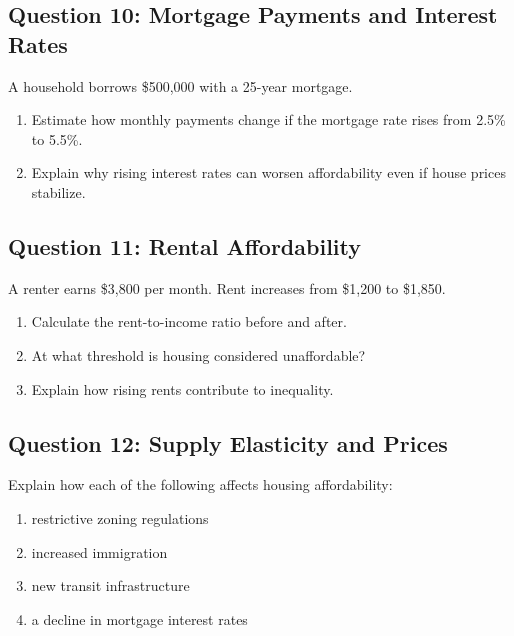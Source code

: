 \documentclass[11pt]{article}
\begin{document}

\subsection*{Question 10: Mortgage Payments and Interest Rates}

A household borrows \$500,000 with a 25-year mortgage.

\begin{enumerate}
\item Estimate how monthly payments change if the mortgage rate rises from 2.5\% to 5.5\%.
\item Explain why rising interest rates can worsen affordability even if house prices stabilize.
\end{enumerate}


\subsection*{Question 11: Rental Affordability}

A renter earns \$3,800 per month. Rent increases from \$1,200 to \$1,850.

\begin{enumerate}
\item Calculate the rent-to-income ratio before and after.
\item At what threshold is housing considered unaffordable?
\item Explain how rising rents contribute to inequality.
\end{enumerate}


\subsection*{Question 12: Supply Elasticity and Prices}

Explain how each of the following affects housing affordability:

\begin{enumerate}
\item restrictive zoning regulations
\item increased immigration
\item new transit infrastructure
\item a decline in mortgage interest rates
\end{enumerate}
\newpage
\end{document}
